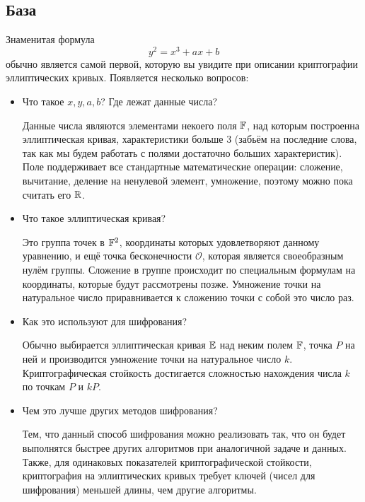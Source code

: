 \subsection{База}
Знаменитая формула
\[y^2 = x^3 + ax + b\]
обычно является самой первой, которую вы увидите при описании криптографии эллиптических кривых. Появляется несколько вопросов:
\begin{itemize}
  \item Что такое $x,y,a,b$? Где лежат данные числа?

  Данные числа являются элементами некоего поля $\mathbb F$, над которым построенна эллиптическая кривая, характеристики больше 3 (забьём на последние слова, так как мы будем работать с полями достаточно больших характеристик). Поле поддерживает все стандартные математические операции: сложение, вычитание, деление на ненулевой элемент, умножение, поэтому можно пока считать его $\mathbb R$.
  \item Что такое эллиптическая кривая?

  Это группа точек в $\mathbb F^2$, координаты которых удовлетворяют данному уравнению, и ещё точка бесконечности $\mathcal{O}$, которая является своеобразным нулём группы. Сложение в группе происходит по специальным формулам на координаты, которые будут рассмотрены позже. Умножение точки на натуральное число приравнивается к сложению точки с собой это число раз.
  \item Как это используют для шифрования?

  Обычно выбирается эллиптическая кривая $\mathbb E$ над неким полем $\mathbb F$, точка $P$ на ней и производится умножение точки на натуральное число $k$. Криптографическая стойкость достигается сложностью нахождения числа $k$ по точкам $P$ и $kP$. 
  \item Чем это лучше других методов шифрования?

  Тем, что данный способ шифрования можно реализовать так, что он будет выполнятся быстрее других алгоритмов при аналогичной задаче и данных. Также, для одинаковых показателей криптографической стойкости, криптография на эллиптических кривых требует ключей (чисел для шифрования) меньшей длины, чем другие алгоритмы.
\end{itemize}

